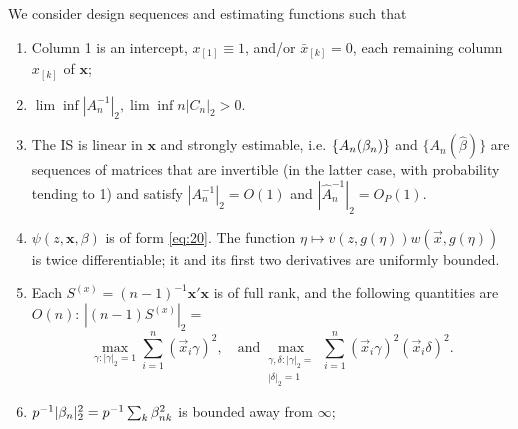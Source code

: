 \documentclass{article}
\theoremstyle{remark}
\begin{document}
We consider design sequences and estimating functions such that 
\renewcommand{\theenumi}{A\arabic{enumi}}
\begin{enumerate}
\item \label{A-centering} Column 1 is an intercept, $x_{[1]} \equiv 1$, and/or $\bar{x}_{[k]}=0$, each remaining column $x_{[k]}$ of $\mathbf{x}$;
\item \label{A-boundedinfo}
$\lim\inf |A_{n}^{-1}|_{2},  \lim\inf n|C_{n}|_{2} > 0 $.
\item\label{A-estimable} The IS is linear in $\mathbf{x}$ and strongly estimable, i.e.  $\{A_{n}(\betatrue)\}$ and $\{A_{n}(\hat\beta)\}$ are sequences of matrices that are invertible (in the latter case, with probability tending to 1) and satisfy $|{A}_{n}^{-1}|_{2}=O(1)$ and $|\hat{A}_{n}^{-1}|_{2}= O_{P}(1)$. 
\item \label{A-psismooth} $\psi(z, \mathbf{x}, \beta)$ is of form \eqref{eq:20}. The function $\eta \mapsto v(z, g(\eta))w(\vec{x}, g(\eta))$ is twice differentiable; it and its first two derivatives are uniformly bounded. 
\item \label{A-l2Sfinite} Each $S^{(x)} = (n-1)^{-1}\mathbf{x}'\mathbf{x}$ is of full rank, and the following quantities are $O(n)$:  $|(n-1)S^{(x)}|_{2} =$ 
$$\max_{\gamma: |\gamma|_{2}=1} \sum_{i=1}^{n}(\vec{x}_{i}\gamma)^{2},\quad 
\text{and}
\max_{\substack{\gamma, \delta: |\gamma|_{2}=\\ |\delta|_{2} =1}} \sum_{i=1}^{n}(\vec{x}_{i}\gamma)^{2} (\vec{x}_{i}\delta)^{2}.$$ 
\item \label{A-regPS} $p^{-1}|\betatrue|_{2}^{2} = p^{-1} \sum_k \betatrue[k]^2$ is bounded away from $\infty$;

\end{enumerate}
\end{document}
